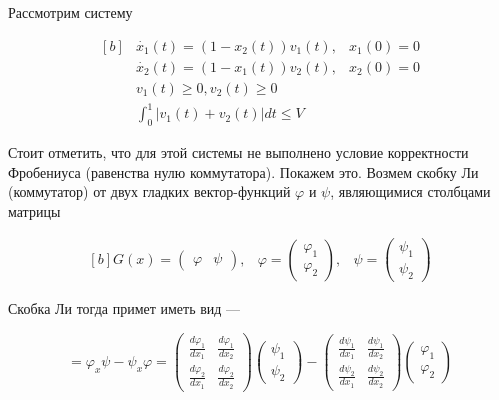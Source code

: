 Рассмотрим систему 

\begin{equation*}
  \begin{aligned}[b]
    &\dot{x_1}(t) = (1 -x_2(t))v_1(t), & x_1(0)=0\\
    &\dot{x_2}(t) = (1-x_1(t))v_2(t), & x_2(0) = 0\\[8pt]
    &v_1(t) \ge 0, v_2(t) \ge 0 \\
    &\int_{0}^{1} |v_1(t) + v_2(t)| dt \le V
  \end{aligned}
\end{equation*}


Стоит отметить, что для этой системы не выполнено условие корректности
Фробениуса (равенства нулю коммутатора). Покажем это. Возмем скобку
Ли (коммутатор) от двух гладких вектор-функций $\varphi$ и $\psi$,
являющимися столбцами матрицы

\begin{equation*}
  \begin{aligned}[b]
    G(x) = 
    \begin{pmatrix}
      \varphi & \psi
    \end{pmatrix},
    &
    \varphi =
    \begin{pmatrix}
      \varphi_1\\ \varphi_2
    \end{pmatrix},
    &
    \psi =
    \begin{pmatrix}
      \psi_1 \\ \psi_2
    \end{pmatrix}
  \end{aligned}
\end{equation*}


Скобка Ли тогда примет иметь вид ---

\begin{equation*}
  [\varphi,\psi] = \varphi_x \psi - \psi_x \varphi = 
  \begin{pmatrix}
    \frac{d \varphi_1}{d x_1} & \frac{d \varphi_1}{d x_2} \\
    \frac{d \varphi_2}{d x_1} & \frac{d \varphi_2}{d x_2}
  \end{pmatrix}
  \begin{pmatrix}
    \psi_1 \\ \psi_2
  \end{pmatrix}
  -
  \begin{pmatrix}
    \frac{d \psi_1}{d x_1} & \frac{d \psi_1}{d x_2} \\
    \frac{d \psi_2}{d x_1} & \frac{d \psi_2}{d x_2}
  \end{pmatrix}
  \begin{pmatrix}
    \varphi_1 \\ \varphi_2
  \end{pmatrix}
\end{equation*}

